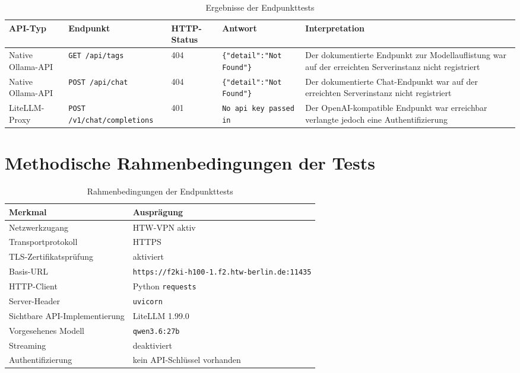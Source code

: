 \documentclass[11pt,a4paper,oneside,ngerman]{memoir}
\begin{document}
\begin{table}[htbp]
\centering
\caption{Ergebnisse der Endpunkttests}
\label{tab:endpoint-results}
\small
\begin{tabularx}{\textwidth}{
    @{}
    p{}
    p{}
    p{}
    p{}
    X
    @{}
}
\toprule
\textbf{API-Typ} &
\textbf{Endpunkt} &
\textbf{HTTP-Status} &
\textbf{Antwort} &
\textbf{Interpretation} \\
\midrule
Native Ollama-API &
\texttt{GET /api/tags} &
404 &
\texttt{\{"detail":"Not Found"\}} &
Der dokumentierte Endpunkt zur Modellauflistung war auf der erreichten Serverinstanz nicht registriert \\
\addlinespace
Native Ollama-API &
\texttt{POST /api/chat} &
404 &
\texttt{\{"detail":"Not Found"\}} &
Der dokumentierte Chat-Endpunkt war auf der erreichten Serverinstanz nicht registriert \\
\addlinespace
LiteLLM-Proxy &
\texttt{POST /v1/chat/completions} &
401 &
\texttt{No api key passed in} &
Der OpenAI-kompatible Endpunkt war erreichbar verlangte jedoch eine Authentifizierung \\
\bottomrule
\end{tabularx}
\end{table}

\section{Methodische Rahmenbedingungen der Tests}

\begin{table}[htbp]
\centering
\caption{Rahmenbedingungen der Endpunkttests}
\label{tab:test-environment}
\small
\begin{tabularx}{\textwidth}{@{}p{}X@{}}
\toprule
\textbf{Merkmal} & \textbf{Ausprägung} \\
\midrule
Netzwerkzugang & HTW-VPN aktiv \\
Transportprotokoll & HTTPS \\
TLS-Zertifikatsprüfung & aktiviert \\
Basis-URL &
\texttt{https://f2ki-h100-1.f2.htw-berlin.de:11435} \\
HTTP-Client & Python \texttt{requests} \\
Server-Header & \texttt{uvicorn} \\
Sichtbare API-Implementierung & LiteLLM 1.99.0 \\
Vorgesehenes Modell & \texttt{qwen3.6:27b} \\
Streaming & deaktiviert \\
Authentifizierung & kein API-Schlüssel vorhanden \\
\bottomrule
\end{tabularx}
\end{table}
\end{document}
